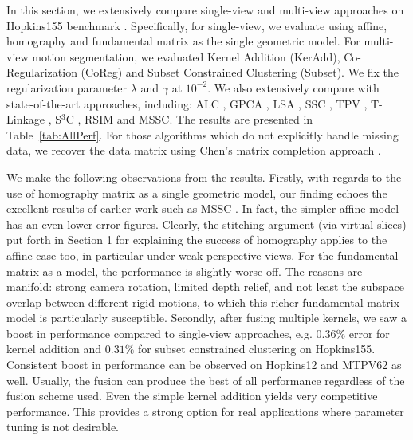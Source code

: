 \documentclass[10pt,twocolumn,letterpaper]{article}
\begin{document}
In this section, we extensively compare single-view and multi-view approaches on Hopkins155 benchmark \cite{Tron2007}. Specifically, for single-view, we evaluate using affine, homography and fundamental matrix as the single geometric model. For multi-view motion segmentation, we evaluated Kernel Addition (KerAdd), Co-Regularization (CoReg) \cite{Kumar2011} and {Subset Constrained Clustering (Subset)}. We fix the regularization parameter $\lambda$ and $\gamma$ at $10^{-2}$. 
We also extensively compare with state-of-the-art approaches, including:  ALC \cite{Rao2010}, GPCA \cite{Vidal2008}, LSA \cite{Yan2006}, SSC \cite{Elhamifar2013}, TPV \cite{Li2013}, T-Linkage \cite{Magri2014}, S$^3$C \cite{Li2015}, RSIM \cite{Ji2016} and MSSC\cite{Lai2017}. The results are presented in Table~\ref{tab:AllPerf}. For those algorithms which do not explicitly handle missing data, we recover the data matrix using Chen's matrix completion approach \cite{Chen2008}.

We make the following observations from the results. Firstly, with regards to the use of homography matrix as a single geometric model, our finding echoes the excellent results of earlier work such as MSSC \cite{Lai2017}. In fact, the simpler affine model has an even lower error figures. Clearly, the stitching argument (via virtual slices) put forth in Section 1 for explaining the success of homography applies to the affine case too, in particular under weak perspective views. For the fundamental matrix as a model, the performance is slightly worse-off. The reasons are manifold: strong camera rotation, limited depth relief, and not least the subspace overlap between different rigid motions, to which this richer fundamental matrix model is particularly susceptible. 
Secondly, after fusing multiple kernels, we saw a boost in performance compared to single-view approaches, e.g. $0.36\%$ error for kernel addition and $0.31\%$ for subset constrained clustering on Hopkins155. Consistent boost in performance can be observed on Hopkins12 and MTPV62 as well. Usually, the fusion can produce the best of all performance regardless of the fusion scheme used. Even the simple kernel addition yields very competitive performance. This provides a strong option for real applications where parameter tuning is not desirable. 
\end{document}
